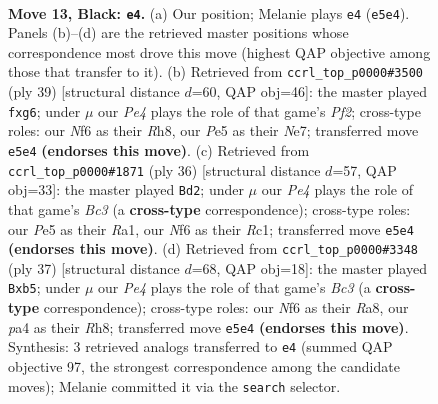 \documentclass[11pt]{article}
\begin{document}
\clearpage

\begin{figure}[p]\centering
\begin{subfigure}{0.46\textwidth}\centering
\resizebox{\linewidth}{!}{%
\newchessgame
\chessboard[
  setfen={r1br2k1/1pp3bp/p4np1/4pp2/PPP2P1P/6P1/4P1B1/RNB2RK1 b - - 0 13},
  showmover=false,
  pgfstyle=straightmove, color=movearrow, markmove={e5-e4}
]}
\caption{}
\end{subfigure}\hfill
\begin{subfigure}{0.46\textwidth}\centering
\resizebox{\linewidth}{!}{%
\newchessgame
\chessboard[
  setfen={r4k1r/pp2np2/4p1Pp/2PbP3/3Pp3/P1R5/3B1PP1/1R2KB2 b - - 0 20},
  showmover=false,
  pgfstyle=straightmove, color=movearrow, markmove={f7-g6}
]}
\caption{}
\end{subfigure}
\\[4pt]
\begin{subfigure}{0.46\textwidth}\centering
\resizebox{\linewidth}{!}{%
\newchessgame
\chessboard[
  setfen={r1r3k1/3nppbp/6p1/pp1p1b2/3P4/1PB1PNP1/1P3PBP/R1R3K1 w - - 1 19},
  showmover=false,
  pgfstyle=straightmove, color=movearrow, markmove={c3-d2}
]}
\caption{}
\end{subfigure}\hfill
\begin{subfigure}{0.46\textwidth}\centering
\resizebox{\linewidth}{!}{%
\newchessgame
\chessboard[
  setfen={r3k2r/1ppn1pb1/2b3p1/pB2p2p/P3P3/1NP5/1P3PPP/RKB1R3 b kq - 1 19},
  showmover=false,
  pgfstyle=straightmove, color=movearrow, markmove={c6-b5}
]}
\caption{}
\end{subfigure}
\caption{\textbf{Move 13, Black: \texttt{e4}.} (a) Our position; Melanie plays \texttt{e4} (\texttt{e5e4}). Panels (b)--(d) are the retrieved master positions whose correspondence most drove this move (highest QAP objective among those that transfer to it). (b) Retrieved from \texttt{ccrl\_top\_p0000\#3500} (ply 39) [structural distance $d$=60, QAP obj=46]: the master played \texttt{fxg6}; under $\mu$ our \emph{Pe4} plays the role of that game's \emph{Pf2}; cross-type roles: our \emph{N}f6 as their \emph{R}h8, our \emph{P}e5 as their \emph{N}e7; transferred move \texttt{e5e4} \textbf{(endorses this move)}. (c) Retrieved from \texttt{ccrl\_top\_p0000\#1871} (ply 36) [structural distance $d$=57, QAP obj=33]: the master played \texttt{Bd2}; under $\mu$ our \emph{Pe4} plays the role of that game's \emph{Bc3} (a \textbf{cross-type} correspondence); cross-type roles: our \emph{P}e5 as their \emph{R}a1, our \emph{N}f6 as their \emph{R}c1; transferred move \texttt{e5e4} \textbf{(endorses this move)}. (d) Retrieved from \texttt{ccrl\_top\_p0000\#3348} (ply 37) [structural distance $d$=68, QAP obj=18]: the master played \texttt{Bxb5}; under $\mu$ our \emph{Pe4} plays the role of that game's \emph{Bc3} (a \textbf{cross-type} correspondence); cross-type roles: our \emph{N}f6 as their \emph{R}a8, our \emph{p}a4 as their \emph{R}h8; transferred move \texttt{e5e4} \textbf{(endorses this move)}. Synthesis: 3 retrieved analogs transferred to \texttt{e4} (summed QAP objective 97, the strongest correspondence among the candidate moves); Melanie committed it via the \texttt{search} selector.}
\label{fig:thought-m25}
\end{figure}
\end{document}
